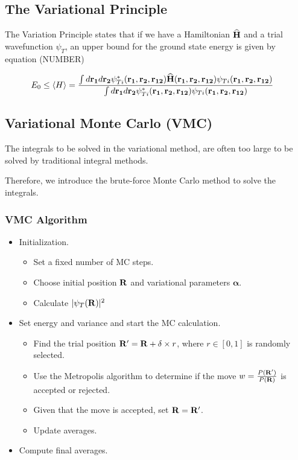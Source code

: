 \documentclass[twocolumn]{article}[12pt]
\newcommand{\eq}[1]{\begin{align*}#1\end{align*}}
\renewcommand\vec[1]{{\bf #1}}
\newcommand{\OP}[1]{{\bf\widehat{#1}}}
\begin{document}
\subsection{The Variational Principle}
The Variation Principle states that if we have a Hamiltonian
$\OP H$ and a trial wavefunction $\psi_{T}$,
an upper bound for the ground state energy is given by equation (NUMBER)
\begin{strip}
{
\eq{
	&E_0 \leq
	\langle H \rangle =
	\frac{\int d{\bf r_1}d{\bf r_2}\psi^{\ast}_{Ti}({\bf r_1},{\bf r_2}, 
	{\bf r_{12}})
	\OP{H}({\bf r_1},{\bf r_2}, {\bf r_{12}})
	\psi_{Ti}({\bf r_1},{\bf r_2}, {\bf r_{12}})}
	{\int d{\bf r_1}d{\bf r_2}\psi^{\ast}_{Ti}({\bf r_1},{\bf r_2}, {\bf r_{12}})
	\psi_{Ti}({\bf r_1},{\bf r_2}, {\bf r_{12}})}
}}%
\end{strip}


\subsection{Variational Monte Carlo (VMC)}
The integrals to be solved in the variational method,
are often too large to be solved by traditional integral methods.

Therefore, we introduce the brute-force Monte Carlo method
to solve the integrals.

\subsubsection{VMC Algorithm}

\begin{itemize}
    \item Initialization.
    \begin{itemize}    
        \item Set a fixed number of MC steps.
        \item Choose initial position $\vec R$ and variational
            parameters $\boldsymbol\alpha$.
        \item Calculate $|\psi_T(\vec R)|^2$
    \end{itemize}
    \item Set energy and variance and start the MC calculation.
    \begin{itemize}    
        \item Find the trial position $\vec R' =\vec R + \delta\times r $,
            where $r\in [0,1]$ is randomly selected.
        \item Use the Metropolis algorithm to determine if the
            move $w =\frac{P(\vec R')}{P(\vec R)}$ is accepted or rejected.
        \item Given that the move is accepted, set $\vec R = \vec R'$.
        \item Update averages.
    \end{itemize}
    \item Compute final averages.
\end{itemize}
\end{document}
